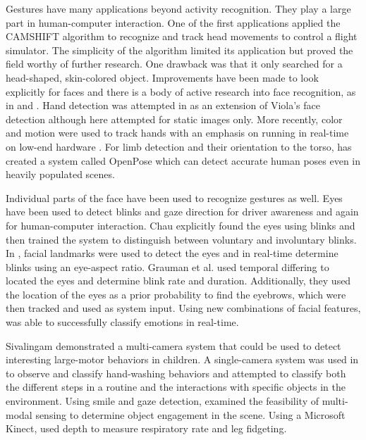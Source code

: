 \documentclass[11pt]{article}
\begin{document}
Gestures have many applications beyond activity recognition. They play a large part in human-computer interaction. One of the first applications \cite{bradski98} applied the CAMSHIFT algorithm to recognize and track head movements to control a flight simulator. The simplicity of the algorithm limited its application but proved the field worthy of further research. One drawback  was that it \cite{bradski98} only searched for a head-shaped, skin-colored object. Improvements have been made to look explicitly for faces and there is a body of active research into face recognition, as in \cite{cech2014} and \cite{viola2004}. Hand detection was attempted in \cite{kolsch2004} as an extension of Viola's face detection although here attempted for static images only. More recently, color and motion were used to track hands with an emphasis on running in real-time on low-end hardware \cite{liu2017}. For limb detection and their orientation to the torso, \cite{cao2016} has created a system called OpenPose which can detect accurate human poses even in heavily populated scenes.

Individual parts of the face have been used to recognize gestures as well. Eyes have been used to detect blinks and gaze direction for driver awareness and again for human-computer interaction. Chau\cite{chau2005} explicitly found the eyes using blinks and then trained the system to distinguish between voluntary and involuntary blinks. In \cite{soukupova2016}, facial landmarks were used to detect the eyes and in real-time determine blinks using an eye-aspect ratio. Grauman et al. \cite{grauman2003} used temporal differing to located the eyes and determine blink rate and duration. Additionally, they used the location of the eyes as a prior probability to find the eyebrows, which were then tracked and used as system input. Using new combinations of facial features, \cite{nguyen2017} was able to successfully classify emotions in real-time.

Sivalingam\cite{sivalingam2012} demonstrated a multi-camera system that could be used to detect interesting large-motor behaviors in children. A single-camera system was used in \cite{fasching2016} to observe and classify hand-washing behaviors and attempted to classify both the different steps in a routine and the interactions with specific objects in the environment. Using smile and gaze detection, \cite{rehg2013} examined the feasibility of multi-modal sensing to determine object engagement in the scene. Using a Microsoft Kinect, \cite{burba2012} used depth to measure respiratory rate and leg fidgeting.
\end{document}
